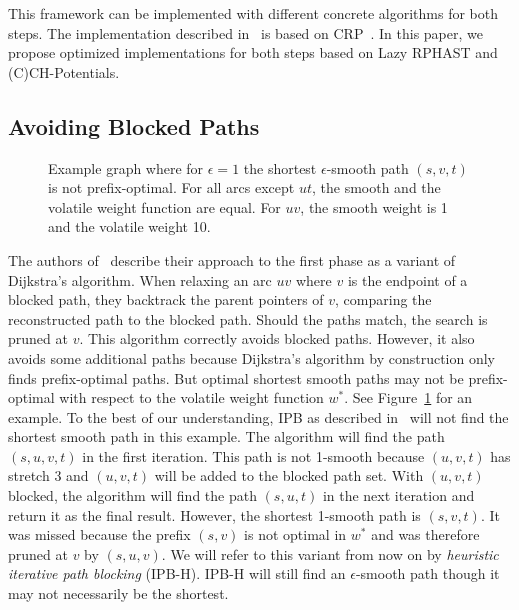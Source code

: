 \documentclass[a4paper,UKenglish,cleveref, autoref, thm-restate]{lipics-v2021}
\begin{document}
This framework can be implemented with different concrete algorithms for both steps.
The implementation described in~\cite{dss-tarrn-18} is based on CRP~\cite{dgpw-crprn-13}.
In this paper, we propose optimized implementations for both steps based on Lazy RPHAST and (C)CH-Potentials.

\subsection{Avoiding Blocked Paths}\label{sec:ipb}

\begin{figure}
\centering
{}
\caption{
Example graph where for $\epsilon = 1$ the shortest $\epsilon$-smooth path $(s,v,t)$ is not prefix-optimal. For all arcs except $ut$, the smooth and the volatile weight function are equal. For $uv$, the smooth weight is 1 and the volatile weight 10.
}
\label{fig:ipb_counterexample}
\end{figure}

The authors of~\cite{dss-tarrn-18} describe their approach to the first phase as a variant of Dijkstra's algorithm.
When relaxing an arc $uv$ where $v$ is the endpoint of a blocked path, they backtrack the parent pointers of $v$, comparing the reconstructed path to the blocked path.
Should the paths match, the search is pruned at $v$.
This algorithm correctly avoids blocked paths.
However, it also avoids some additional paths because Dijkstra's algorithm by construction only finds prefix-optimal paths.
But optimal shortest smooth paths may not be prefix-optimal with respect to the volatile weight function $w^*$.
See Figure~\ref{fig:ipb_counterexample} for an example.
To the best of our understanding, IPB as described in~\cite{dss-tarrn-18} will not find the shortest smooth path in this example.
The algorithm will find the path $(s,u,v,t)$ in the first iteration.
This path is not 1-smooth because $(u,v,t)$ has stretch 3 and $(u,v,t)$ will be added to the blocked path set.
With $(u,v,t)$ blocked, the algorithm will find the path $(s,u,t)$ in the next iteration and return it as the final result.
However, the shortest 1-smooth path is $(s,v,t)$.
It was missed because the prefix $(s,v)$ is not optimal in $w^*$ and was therefore pruned at $v$ by $(s,u,v)$.
We will refer to this variant from now on by \emph{heuristic iterative path blocking} (IPB-H).
IPB-H will still find an $\epsilon$-smooth path though it may not necessarily be the shortest.
\end{document}
